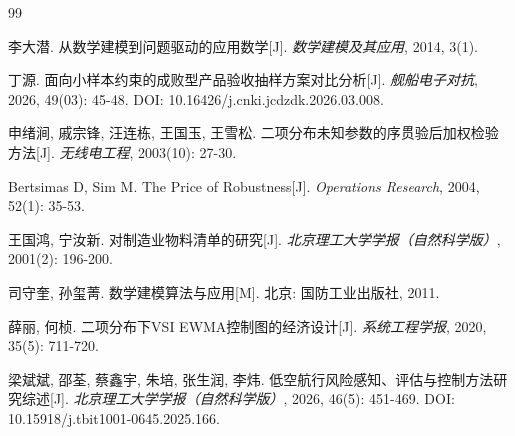 \documentclass[withoutpreface,bwprint]{cumcmthesis}
\numberwithin{equation}{section}
\begin{document}
\begin{thebibliography}{99}


    李大潜.
    从数学建模到问题驱动的应用数学[J].
    \textit{数学建模及其应用}, 2014, 3(1).

    丁源.
    面向小样本约束的成败型产品验收抽样方案对比分析[J].
    \textit{舰船电子对抗}, 2026, 49(03): 45-48.
    DOI: 10.16426/j.cnki.jcdzdk.2026.03.008.

    申绪涧, 戚宗锋, 汪连栋, 王国玉, 王雪松.
    二项分布未知参数的序贯验后加权检验方法[J].
    \textit{无线电工程}, 2003(10): 27-30.

    Bertsimas D, Sim M.
    The Price of Robustness[J].
    \textit{Operations Research}, 2004, 52(1): 35-53.

    王国鸿, 宁汝新.
    对制造业物料清单的研究[J].
    \textit{北京理工大学学报（自然科学版）}, 2001(2): 196-200.

    司守奎, 孙玺菁.
    数学建模算法与应用[M].
    北京: 国防工业出版社, 2011.

    薛丽, 何桢.
    二项分布下VSI EWMA控制图的经济设计[J].
    \textit{系统工程学报}, 2020, 35(5): 711-720.

    梁斌斌, 邵荃, 蔡鑫宇, 朱培, 张生润, 李炜.
    低空航行风险感知、评估与控制方法研究综述[J].
    \textit{北京理工大学学报（自然科学版）}, 2026, 46(5): 451-469.
    DOI: 10.15918/j.tbit1001-0645.2025.166.

\end{thebibliography}
\end{document}
